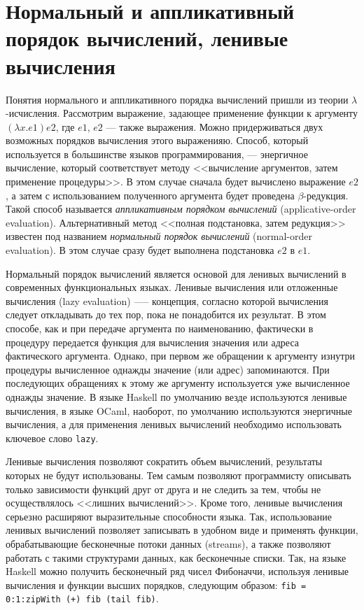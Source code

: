 \section{Нормальный и аппликативный порядок вычислений, ленивые
  вычисления}
Понятия нормального и аппликативного порядка вычислений пришли из
теории $\lambda$-исчисления. Рассмотрим выражение, задающее
применение функции к аргументу $(\lambda x. e1) e2$, где $e1$, $e2$
--- также выражения. Можно придерживаться двух возможных порядков
вычисления этого выраженияю. Способ, который используется в
большинстве языков программирования, --- энергичное вычисление,
который соответствует методу <<вычисление аргументов, затем применение
процедуры>>. В этом случае сначала будет вычислено выражение $e2$, а
затем с использованием полученного аргумента будет проведена
$\beta$-редукция. Такой способ называется \emph{аппликативным порядком
вычислений} (applicative-order evaluation).
Альтернативный метод <<полная подстановка, затем редукция>> известен
под названием \emph{нормальный порядок вычислений} (normal-order
evaluation). В этом случае сразу будет выполнена подстановка $e2$ в
$e1$.

Нормальный порядок вычислений является основой для ленивых вычислений
в современных функциональных языках. Ленивые вычисления или отложенные
вычисления (lazy evaluation) —-- концепция, согласно которой
вычисления следует откладывать до тех пор, пока не понадобится их
результат. В этом способе, как и при передаче аргумента по
наименованию, фактически в процедуру передается функция для вычисления
значения или адреса фактического аргумента. Однако, при первом же
обращении к аргументу изнутри процедуры вычисленное однажды значение
(или адрес) запоминаются. При последующих обращениях к этому же
аргументу используется уже вычисленное однажды значение. В языке
Haskell по умолчанию везде используются ленивые вычисления, в языке
OCaml, наоборот, по умолчанию используются энергичные вычисления, а
для применения ленивых вычислений необходимо использовать ключевое
слово \texttt{lazy}.

Ленивые вычисления позволяют сократить объем вычислений, результаты
которых не будут использованы. Тем самым позволяют программисту
описывать только зависимости функций друг от друга и не следить за
тем, чтобы не осуществлялось <<лишних вычислений>>. Кроме того,
ленивые вычисления серьезно расширяют выразительные способности языка.
Так, использование ленивых вычислений позволяет записывать в удобном
виде и применять функции, обрабатывающие бесконечные потоки данных
(streams), а также позволяют работать с такими структурами данных, как
бесконечные списки. Так, на языке Haskell можно получить бесконечный
ряд чисел Фибоначчи, используя ленивые вычисления и функции высших
порядков, следующим образом: \verb|fib = 0:1:zipWith (+) fib (tail fib)|.

